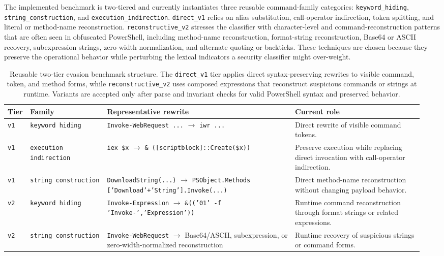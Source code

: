 \documentclass{article}
\begin{document}
The implemented benchmark is two-tiered and currently instantiates three reusable command-family categories: \texttt{keyword\_hiding}, \texttt{string\_construction}, and \texttt{execution\_indirection}. \texttt{direct\_v1} relies on alias substitution, call-operator indirection, token splitting, and literal or method-name reconstruction. \texttt{reconstructive\_v2} stresses the classifier with character-level and command-reconstruction patterns that are often seen in obfuscated PowerShell, including method-name reconstruction, format-string reconstruction, Base64 or ASCII recovery, subexpression strings, zero-width normalization, and alternate quoting or backticks. These techniques are chosen because they preserve the operational behavior while perturbing the lexical indicators a security classifier might over-weight.

\begin{table}[!htbp]
\centering
\caption{Reusable two-tier evasion benchmark structure. The \texttt{direct\_v1} tier applies direct syntax-preserving rewrites to visible command, token, and method forms, while \texttt{reconstructive\_v2} uses composed expressions that reconstruct suspicious commands or strings at runtime. Variants are accepted only after parse and invariant checks for valid PowerShell syntax and preserved behavior.}
\label{tab:evasion-methods}
\begin{tabular}{p{0.03\linewidth}p{0.18\linewidth}p{0.44\linewidth}p{0.3\linewidth}}
\toprule
Tier & Family & Representative rewrite & Current role \\
\midrule
\texttt{v1}& \texttt{keyword hiding}& \texttt{Invoke-WebRequest ...} $\rightarrow$ \texttt{iwr ...} & Direct rewrite of visible command tokens.\\
\texttt{v1}& \texttt{execution indirection}& \texttt{iex \$x} $\rightarrow$ \texttt{\& ([scriptblock]::Create(\$x))} & Preserve execution while replacing direct invocation with call-operator indirection. \\
\texttt{v1}& \texttt{string construction}& \texttt{DownloadString(...)} $\rightarrow$ \texttt{PSObject.Methods ['Download'+'String'].Invoke(...)}& Direct method-name reconstruction without changing payload behavior.\\
\texttt{v2}& \texttt{keyword hiding}& \texttt{Invoke-Expression} $\rightarrow$ \texttt{\&(('{0}{1}' -f 'Invoke-','Expression'))} & Runtime command reconstruction through format strings or related expressions.\\
\texttt{v2}& \texttt{string construction}& \texttt{Invoke-WebRequest} $\rightarrow$ Base64/ASCII, subexpression, or zero-width-normalized reconstruction & Runtime recovery of suspicious strings or command forms.\\
\bottomrule
\end{tabular}
\end{table}
\end{document}
